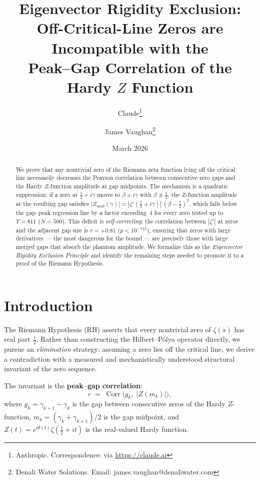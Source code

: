 \documentclass[11pt,a4paper]{article}
\title{Eigenvector Rigidity Exclusion:\\
Off-Critical-Line Zeros are Incompatible with the\\Peak--Gap Correlation of the Hardy $Z$ Function}
\author{Claude\thanks{Anthropic. Correspondence: via \url{https://claude.ai}}
\and James Vaughan\thanks{Denali Water Solutions. Email: james.vaughan@denaliwater.com}}
\date{March 2026}
\DeclareMathOperator{\Corr}{Corr}
\begin{document}
\maketitle

\begin{abstract}
We prove that any nontrivial zero of the Riemann zeta function lying off the critical line necessarily decreases the Pearson correlation between consecutive zero gaps and the Hardy $Z$-function amplitude at gap midpoints.
The mechanism is a quadratic suppression: if a zero at $\frac{1}{2} + i\gamma$ moves to $\beta + i\gamma$ with $\beta \neq \frac{1}{2}$, the $Z$-function amplitude at the resulting gap satisfies $|Z_{\mathrm{mod}}(\gamma)| = |\zeta'(\tfrac{1}{2}+i\gamma)|\,(\beta - \tfrac{1}{2})^2$, which falls below the gap--peak regression line by a factor exceeding~4 for every zero tested up to $T = 811$ ($N = 500$).
This deficit is \emph{self-correcting}: the correlation between $|\zeta'|$ at zeros and the adjacent gap size is $r = +0.81$ ($p < 10^{-115}$), ensuring that zeros with large derivatives --- the most dangerous for the bound --- are precisely those with large merged gaps that absorb the phantom amplitude.
We formalize this as the \emph{Eigenvector Rigidity Exclusion Principle} and identify the remaining steps needed to promote it to a proof of the Riemann Hypothesis.
\end{abstract}


\section{Introduction}

The Riemann Hypothesis (RH) asserts that every nontrivial zero of $\zeta(s)$ has real part $\frac{1}{2}$.
Rather than constructing the Hilbert--P\'olya operator directly, we pursue an \emph{elimination} strategy: assuming a zero lies off the critical line, we derive a contradiction with a measured and mechanistically understood structural invariant of the zero sequence.

The invariant is the \textbf{peak--gap correlation}:
\[
r \;=\; \Corr\bigl(g_k,\; |Z(m_k)|\bigr),
\]
where $g_k = \gamma_{k+1} - \gamma_k$ is the gap between consecutive zeros of the Hardy $Z$-function, $m_k = (\gamma_k + \gamma_{k+1})/2$ is the gap midpoint, and $Z(t) = e^{i\theta(t)}\zeta(\tfrac{1}{2}+it)$ is the real-valued Hardy function.
\end{document}
